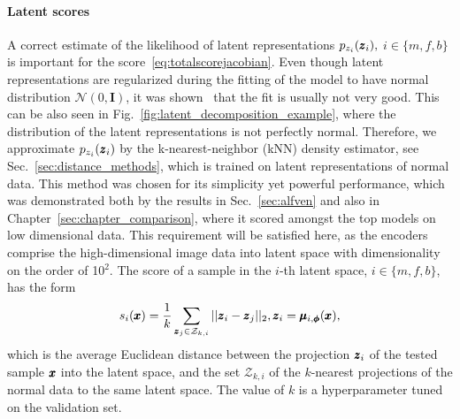 \paragraph{Latent scores} A correct estimate of the likelihood of latent representations $p_{z_{i}}(\pmb{{z}}_i),$ $i \in \{m, f, b\}$ is important for the score~\eqref{eq:totalscorejacobian}. Even though latent representations are regularized during the fitting of the model to have normal distribution $\mathcal{N}(0,\textbf{I})$, it was shown~\cite{dai2019diagnosing} that the fit is usually not very good. This can be also seen in Fig.~\ref{fig:latent_decomposition_example}, where the distribution of the latent representations is not perfectly normal. Therefore, we approximate $p_{z_{i}}(\pmb{{z}}_i)$ by the k-nearest-neighbor (kNN) density estimator, see Sec.~\ref{sec:distance_methods}, which is trained on latent representations of normal data. This method was chosen for its simplicity yet powerful performance, which was demonstrated both by the results in Sec.~\ref{sec:alfven} and also in Chapter~\ref{sec:chapter_comparison}, where it scored amongst the top models on low dimensional data. This requirement will be satisfied here, as the encoders comprise the high-dimensional image data into latent space with dimensionality on the order of 10$^2$. The score of a sample in the $i$-th latent space, $i \in \lbrace m, f, b \rbrace$, has the form
\begin{equation} \label{eq:knnscore}
    s_{i}(\pmb{{x}}) = \frac{1}{k} \sum_{\pmb{{z}}_j \in \mathcal{Z}_{k,i}} \vert \vert \pmb{{z}}_i - \pmb{{z}}_j \vert \vert_2, \pmb{{z}}_i = \pmb{{\mu}}_{i,\pmb{{\phi}}}(\pmb{{x}}), 
\end{equation}
which is the average Euclidean distance between the projection $\pmb{{z}}_i$ of the tested sample $\pmb{{x}}$ into the latent space, and the set $\mathcal{Z}_{k,i}$ of the $k$-nearest projections of the normal data to the same latent space. The value of $k$ is a hyperparameter tuned on the validation set.

